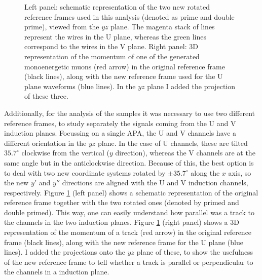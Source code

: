 \begin{figure}[t]
\begin{subfigure}{0.5\textwidth}
	\end{subfigure}
	\caption[Schematic representation of the two rotated reference frames used in the analysis of the MC filter performance.]{Left panel: schematic representation of the two new rotated reference frames used in this analysis (denoted as prime and double prime), viewed from the $yz$ plane. The magenta stack of lines represent the wires in the U plane, whereas the green lines correspond to the wires in the V plane. Right panel: 3D representation of the momentum of one of the generated monoenergetic muons (red arrow) in the original reference frame (black lines), along with the new reference frame used for the U plane waveforms (blue lines). In the $yz$ plane I added the projection of these three.}
	\label{fig:reference_frame}
\end{figure}

Additionally, for the analysis of the samples it was necessary to use two different reference frames, to study separately the signals coming from the U and V induction planes. Focussing on a single APA, the U and V channels have a different orientation in the $yz$ plane. In the case of U channels, these are tilted $35.7^{\circ}$ clockwise from the vertical ($y$ direction), whereas the V channels are at the same angle but in the anticlockwise direction. Because of this, the best option is to deal with two new coordinate systems rotated by $\pm 35.7^{\circ}$ along the $x$ axis, so the new $y'$ and $y''$ directions are aligned with the U and V induction channels, respectively. Figure \ref{fig:reference_frame} (left panel) shows a schematic representation of the original reference frame together with the two rotated ones (denoted by primed and double primed). This way, one can easily understand how parallel was a track to the channels in the two induction planes. Figure \ref{fig:reference_frame} (right panel) shows a 3D representation of the momentum of a track (red arrow) in the original reference frame (black lines), along with the new reference frame for the U plane (blue lines). I added the projections onto the $yz$ plane of these, to show the usefulness of the new reference frame to tell whether a track is parallel or perpendicular to the channels in a induction plane.

